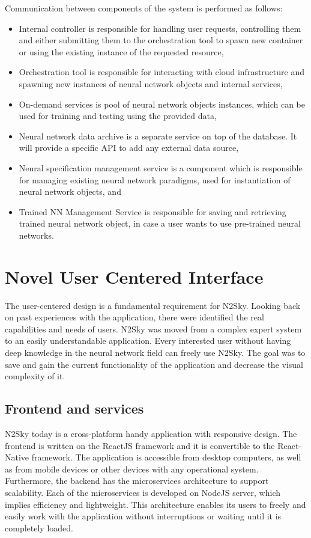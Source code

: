 \documentclass[conference]{IEEEtran}
\begin{document}
Communication between components of the system is performed as follows:
\begin{itemize}
\item Internal controller is responsible for handling user requests, controlling them and either submitting them to the orchestration tool to spawn new container or using the existing instance of the requested resource,
\item Orchestration tool is responsible for interacting with cloud infrastructure and spawning new instances of neural network objects and internal services,
\item On-demand services is pool of neural network objects instances, which can be used for training and testing using the provided data,
\item Neural network data archive is a separate service on top of the database. It will provide a specific API to add any external data source,
\item Neural specification management service is a component which is responsible for managing existing neural network paradigms, used for instantiation of neural network objects, and
\item Trained NN Management Service is responsible for saving and retrieving trained neural network object, in case a user wants to use pre-trained neural networks.
\end{itemize}

\section{Novel User Centered Interface}
\label{sec:interface}

The user-centered design is a fundamental requirement for N2Sky. Looking back on past experiences with the application, there were identified the real capabilities and needs of users. N2Sky was moved from a complex expert system to an easily understandable application. Every interested user without having deep knowledge in the neural network field can freely use N2Sky.  The goal was to save and gain the current functionality of the application and decrease the visual complexity of it.

\subsection{Frontend and services}

N2Sky today is a cross-platform handy application with responsive design. The frontend is written on the ReactJS framework and it is convertible to the React-Native framework. The application is accessible from desktop computers, as well as from mobile devices or other devices with any operational system. Furthermore, the backend has the microservices architecture to support scalability. Each of the microservices is developed on NodeJS server, which implies efficiency and lightweight. This architecture enables its users to freely and easily work with the application without interruptions or waiting until it is completely loaded.
\end{document}
